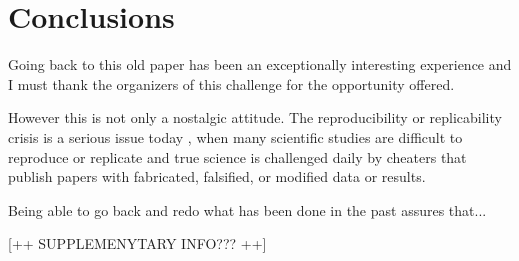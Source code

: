  

\section{Conclusions}

Going back to this old paper has been an exceptionally interesting experience and I must thank the organizers of this challenge for the opportunity offered.

However this is not only a nostalgic attitude. The reproducibility or replicability crisis is a serious issue today \cite{Miyakawa:2020}, when many scientific studies are difficult to reproduce or replicate and  true science is challenged daily by cheaters that publish papers with fabricated, falsified, or modified data or results.

Being able to go back and redo what has been done in the past assures that...


[++ SUPPLEMENYTARY INFO??? ++]



%
%





